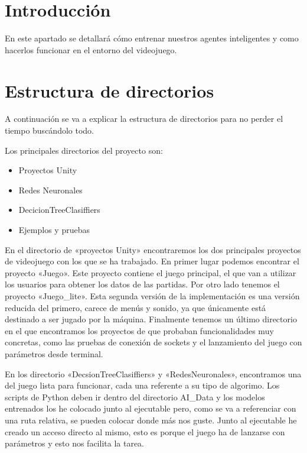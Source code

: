 
\section{Introducción}
En este apartado se detallará cómo entrenar nuestros agentes inteligentes y como hacerlos funcionar en el entorno del videojuego. 

\section{Estructura de directorios}
A continuación se va a explicar la estructura de directorios para no perder el tiempo buscándolo todo.

Los principales directorios del proyecto son:
\begin{itemize}
    \item Proyectos Unity
    \item Redes Neuronales
    \item DecicionTreeClasiffiers
    \item Ejemplos y pruebas
\end{itemize}

En el directorio de «proyectos Unity»  encontraremos los dos principales proyectos de videojuego con los que se ha trabajado. En primer lugar podemos encontrar el proyecto «Juego». Este proyecto contiene el juego principal, el que van a utilizar los usuarios para obtener los datos de las partidas. Por otro lado tenemos el proyecto «Juego\_lite». Esta segunda versión de la implementación es una versión reducida del primero, carece de menús y sonido, ya que únicamente está destinado a ser jugado por la máquina. Finalmente tenemos un último directorio en el que encontramos los proyectos de que probaban funcionalidades muy concretas, como las pruebas de conexión de sockets y el lanzamiento del juego con parámetros desde terminal.

En los directorio «DecsionTreeClasiffiers» y «RedesNeuronales», encontramos una  del juego lista para funcionar, cada una referente a su tipo de algorimo. Los scripts de Python deben ir dentro del directorio AI\_Data y los modelos entrenados los he colocado junto al ejecutable pero, como se va a referenciar con una ruta relativa, se pueden colocar donde más nos guste. Junto al ejecutable he creado un acceso directo al mismo, esto es porque el juego ha de lanzarse con parámetros y esto nos facilita la tarea.


